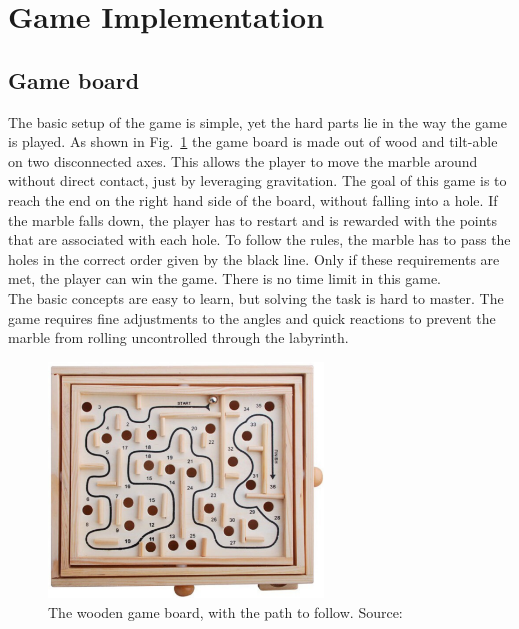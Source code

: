 

\section{Game Implementation}\label{sec:game-implementation}

\subsection{Game board}\label{subsec:game-board}
The basic setup of the game is simple, yet the hard parts lie in the way the game is played.
As shown in Fig.~\ref{fig:wooden_board} the game board is made out of wood and tilt-able on two disconnected axes.
This allows the player to move the marble around without direct contact, just by leveraging gravitation.
The goal of this game is to reach the end on the right hand side of the board, without falling into a hole.
If the marble falls down, the player has to restart and is rewarded with the points that are associated with each hole.
To follow the rules, the marble has to pass the holes in the correct order given by the black line.
Only if these requirements are met, the player can win the game.
There is no time limit in this game.\\
The basic concepts are easy to learn, but solving the task is hard to master.
The game requires fine adjustments to the angles and quick reactions to prevent the marble from rolling uncontrolled through
the labyrinth.

\begin{figure}[h]
    \centering
    \includegraphics[width=0.65\textwidth]{images/wooden_game_board}
    \caption{The wooden game board, with the path to follow. Source:~\cite{wooden_board}}
    \label{fig:wooden_board}
\end{figure}

